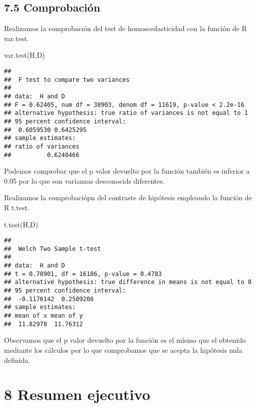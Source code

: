 \documentclass[
  a4paper]{article}
\newenvironment{Shaded}{\begin{snugshade}}{\end{snugshade}}
\newcommand{\FunctionTok}[1]{\textcolor[rgb]{0.00,0.00,0.00}{#1}}
\newcommand{\NormalTok}[1]{#1}
\begin{document}
\hypertarget{comprobaciuxf3n-4}{%
\subsection{7.5 Comprobación}\label{comprobaciuxf3n-4}}

Realizamos la comprobación del test de homoscedasticidad con la función
de R var.test.

\begin{Shaded}
\begin{Highlighting}[]
\FunctionTok{var.test}\NormalTok{(H,D)}
\end{Highlighting}
\end{Shaded}

\begin{verbatim}
## 
##  F test to compare two variances
## 
## data:  H and D
## F = 0.62405, num df = 38903, denom df = 11619, p-value < 2.2e-16
## alternative hypothesis: true ratio of variances is not equal to 1
## 95 percent confidence interval:
##  0.6059530 0.6425295
## sample estimates:
## ratio of variances 
##          0.6240466
\end{verbatim}

Podemos comprobar que el p valor devuelto por la función también es
inferior a 0.05 por lo que son varianzas desconocids diferentes.

Realizamos la comprobaciópn del contraste de hipótesis empleando la
función de R t.test.

\begin{Shaded}
\begin{Highlighting}[]
\FunctionTok{t.test}\NormalTok{(H,D)}
\end{Highlighting}
\end{Shaded}

\begin{verbatim}
## 
##  Welch Two Sample t-test
## 
## data:  H and D
## t = 0.70901, df = 16186, p-value = 0.4783
## alternative hypothesis: true difference in means is not equal to 0
## 95 percent confidence interval:
##  -0.1176142  0.2509208
## sample estimates:
## mean of x mean of y 
##  11.82978  11.76312
\end{verbatim}

Observamos que el p valor devuelto por la función es el mísmo que el
obtenido mediante los cálculos por lo que comprobamos que se acepta la
hipótesis nula definida.

\hypertarget{resumen-ejecutivo}{%
\section{8 Resumen ejecutivo}\label{resumen-ejecutivo}}
\end{document}
